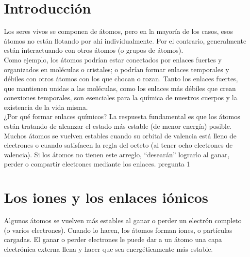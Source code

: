 \section{Introducción}
\vbox{\leftskip\leftmargin Los seres vivos se componen de átomos, pero en la mayoría de los casos, esos átomos no están flotando por ahí individualmente. Por el contrario, generalmente están interactuando con otros átomos (o grupos de átomos).\\

    Como ejemplo, los átomos podrían estar conectados por enlaces fuertes y organizados en moléculas o cristales; o podrían formar enlaces temporales y débiles con otros átomos con los que chocan o rozan. Tanto los enlaces fuertes, que mantienen unidas a las moléculas, como los enlaces más débiles que crean conexiones temporales, son esenciales para la química de nuestros cuerpos y la existencia de la vida misma.\\

    ¿Por qué formar enlaces químicos? La respuesta fundamental es que los átomos están tratando de alcanzar el estado más estable (de menor energía) posible. Muchos átomos se vuelven estables cuando su orbital de valencia está lleno de electrones o cuando satisfacen la regla del octeto (al tener ocho electrones de valencia). Si los átomos no tienen este arreglo, ``desearán'' lograrlo al ganar, perder o compartir electrones mediante los enlaces.}
\question[99] pregunta 1



\section{Los iones y los enlaces iónicos}

Algunos átomos se vuelven más estables al ganar o perder un electrón completo (o varios electrones). Cuando lo hacen, los átomos forman iones, o partículas cargadas. El ganar o perder electrones le puede dar a un átomo una capa electrónica externa llena y hacer que sea energéticamente más estable.

